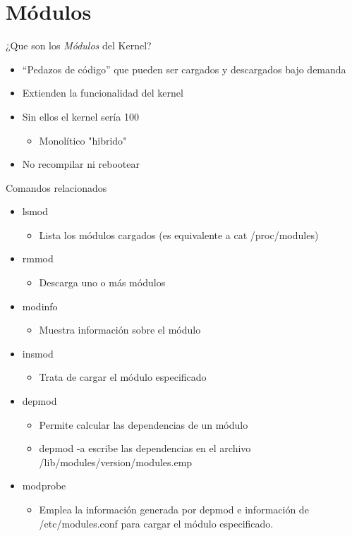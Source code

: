 \section{Módulos}

\begin{frame}{¿Que son los \textit{Módulos} del Kernel?}
  \begin{itemize}
  \item “Pedazos de código” que pueden ser cargados y descargados bajo demanda 
  \item Extienden la funcionalidad del kernel
  \item Sin ellos el kernel sería 100%
  \begin{itemize}
    \item Monolítico "hibrido"
  \end{itemize} 
 \item No recompilar ni rebootear   
  \end{itemize}
\end{frame}

\begin{frame}{Comandos relacionados}
  \begin{itemize}
  \item lsmod 
  	\begin{itemize}
  	  \item Lista los módulos cargados (es equivalente a cat /proc/modules) 
  	\end{itemize} 
  \item rmmod
  	\begin{itemize}
  	  \item Descarga uno o más módulos 
  	\end{itemize} 
  \item modinfo   
	  \begin{itemize}
	    \item  Muestra información sobre el módulo 
	  \end{itemize} 
 \item insmod
	  \begin{itemize}
	    \item Trata de cargar el módulo especificado 
	  \end{itemize} 
 \item depmod
	  \begin{itemize}
	    \item Permite calcular las dependencias de un módulo
             \item depmod -a escribe las dependencias en el archivo /lib/modules/version/modules.emp  
	  \end{itemize} 
 \item modprobe    
 	\begin{itemize}
             \item Emplea la información generada por depmod e información de /etc/modules.conf 
             para cargar el módulo especificado. 
  	\end{itemize} 
  \end{itemize}

\end{frame}




